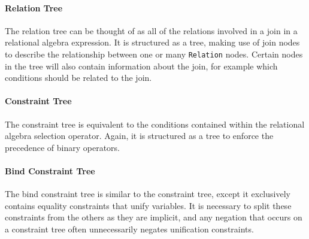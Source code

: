 \documentclass[a4paper, 11pt]{article}
\begin{document}
      \paragraph{Relation Tree}
            The relation tree can be thought of as all of the relations
            involved in a join in a relational algebra expression. It is
            structured as a tree, making use of join nodes to describe the
            relationship between one or many \texttt{Relation} nodes. Certain nodes in
            the tree will also contain information about the join, for example
            which conditions should be related to the join.

      \paragraph{Constraint Tree}
            The constraint tree is equivalent to the conditions contained
            within the relational algebra selection operator. Again, it is
            structured as a tree to enforce the precedence of binary operators.

      \paragraph{Bind Constraint Tree}
            The bind constraint tree is similar to the constraint tree, except
            it exclusively contains equality constraints that unify variables.
            It is necessary to split these constraints from the others as
            they are implicit, and any negation that occurs on a constraint
            tree often unnecessarily negates unification constraints.
\end{document}
